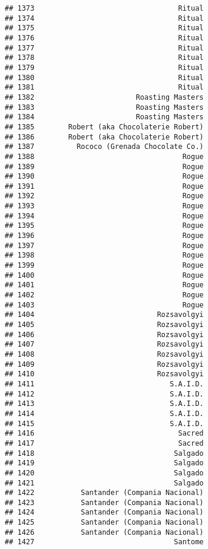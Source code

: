 \documentclass[
]{article}
\begin{document}
\begin{verbatim}
## 1373                                  Ritual
## 1374                                  Ritual
## 1375                                  Ritual
## 1376                                  Ritual
## 1377                                  Ritual
## 1378                                  Ritual
## 1379                                  Ritual
## 1380                                  Ritual
## 1381                                  Ritual
## 1382                        Roasting Masters
## 1383                        Roasting Masters
## 1384                        Roasting Masters
## 1385        Robert (aka Chocolaterie Robert)
## 1386        Robert (aka Chocolaterie Robert)
## 1387          Rococo (Grenada Chocolate Co.)
## 1388                                   Rogue
## 1389                                   Rogue
## 1390                                   Rogue
## 1391                                   Rogue
## 1392                                   Rogue
## 1393                                   Rogue
## 1394                                   Rogue
## 1395                                   Rogue
## 1396                                   Rogue
## 1397                                   Rogue
## 1398                                   Rogue
## 1399                                   Rogue
## 1400                                   Rogue
## 1401                                   Rogue
## 1402                                   Rogue
## 1403                                   Rogue
## 1404                             Rozsavolgyi
## 1405                             Rozsavolgyi
## 1406                             Rozsavolgyi
## 1407                             Rozsavolgyi
## 1408                             Rozsavolgyi
## 1409                             Rozsavolgyi
## 1410                             Rozsavolgyi
## 1411                                S.A.I.D.
## 1412                                S.A.I.D.
## 1413                                S.A.I.D.
## 1414                                S.A.I.D.
## 1415                                S.A.I.D.
## 1416                                  Sacred
## 1417                                  Sacred
## 1418                                 Salgado
## 1419                                 Salgado
## 1420                                 Salgado
## 1421                                 Salgado
## 1422           Santander (Compania Nacional)
## 1423           Santander (Compania Nacional)
## 1424           Santander (Compania Nacional)
## 1425           Santander (Compania Nacional)
## 1426           Santander (Compania Nacional)
## 1427                                 Santome

\end{verbatim}
\end{document}
